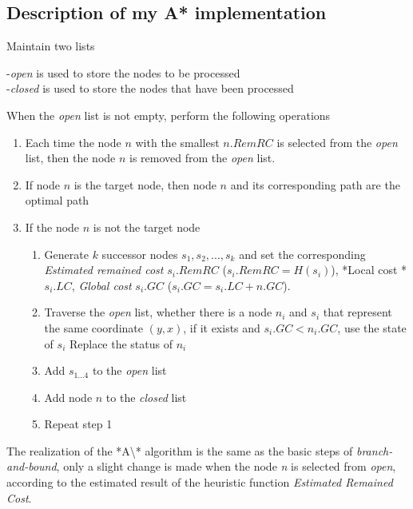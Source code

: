 \documentclass[
]{article}
\begin{document}
\hypertarget{header-n353}{%
\subsection{Description of my A* implementation}\label{header-n353}}

Maintain two lists

-\emph{open} is used to store the nodes to be processed\\
-\emph{closed} is used to store the nodes that have been processed

When the \emph{open} list is not empty, perform the following operations

\begin{enumerate}
\def\labelenumi{\arabic{enumi}.}
\item
  Each time the node \(n\) with the smallest \(n.RemRC\) is selected
  from the \emph{open} list, then the node \(n\) is removed from the
  \emph{open} list.
\item
  If node \(n\) is the target node, then node \(n\) and its
  corresponding path are the optimal path
\item
  If the node \(n\) is not the target node

  \begin{enumerate}
  \def\labelenumii{\arabic{enumii}.}
  \item
    Generate \(k\) successor nodes \(s_1, s_2, ..., s_k\) and set the
    corresponding \emph{Estimated remained cost} \(s_i.RemRC\)
    (\(s_i.RemRC = H(s_i)\)), *Local cost * \(s_i.LC\), \emph{Global
    cost} \(s_i.GC\) (\(s_i.GC = s_i.LC + n.GC\)).
  \item
    Traverse the \emph{open} list, whether there is a node \(n_i\) and
    \(s_i\) that represent the same coordinate \((y, x)\), if it exists
    and \(s_i.GC <n_i.GC\), use the state of \(s_i\) Replace the status
    of \(n_i\)
  \item
    Add \(s_{1...4}\) to the \emph{open} list
  \item
    Add node \(n\) to the \emph{closed} list
  \item
    Repeat step 1
  \end{enumerate}
\end{enumerate}

The realization of the *A\textbackslash** algorithm is the same as the
basic steps of \emph{branch-and-bound}, only a slight change is made
when the node \emph{n} is selected from \emph{open}, according to the
estimated result of the heuristic function \emph{Estimated Remained
Cost}.
\end{document}
